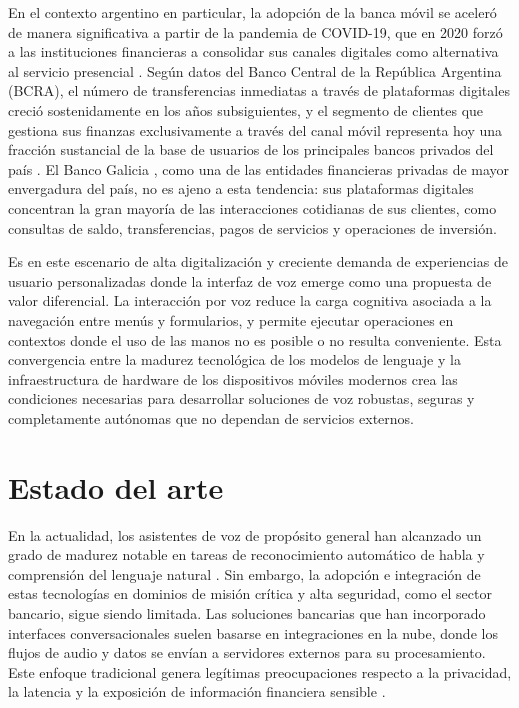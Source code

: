 En el contexto argentino en particular, la adopción de la banca móvil se aceleró de manera significativa a partir de la pandemia de COVID-19, que en 2020 forzó a las instituciones financieras a consolidar sus canales digitales como alternativa al servicio presencial \citep{rengifo2022}. Según datos del Banco Central de la República Argentina (BCRA), el número de transferencias inmediatas a través de plataformas digitales creció sostenidamente en los años subsiguientes, y el segmento de clientes que gestiona sus finanzas exclusivamente a través del canal móvil representa hoy una fracción sustancial de la base de usuarios de los principales bancos privados del país \citep{WEBSITE:1}. El Banco Galicia \citep{clarin2024galicia}, como una de las entidades financieras privadas de mayor envergadura del país, no es ajeno a esta tendencia: sus plataformas digitales concentran la gran mayoría de las interacciones cotidianas de sus clientes, como consultas de saldo, transferencias, pagos de servicios y operaciones de inversión.

Es en este escenario de alta digitalización y creciente demanda de experiencias de usuario personalizadas donde la interfaz de voz emerge como una propuesta de valor diferencial. La interacción por voz reduce la carga cognitiva asociada a la navegación entre menús y formularios, y permite ejecutar operaciones en contextos donde el uso de las manos no es posible o no resulta conveniente. Esta convergencia entre la madurez tecnológica de los modelos de lenguaje y la infraestructura de hardware de los dispositivos móviles modernos crea las condiciones necesarias para desarrollar soluciones de voz robustas, seguras y completamente autónomas que no dependan de servicios externos.



\section{Estado del arte}

En la actualidad, los asistentes de voz de propósito general han alcanzado un grado de madurez notable en tareas de reconocimiento automático de habla y comprensión del lenguaje natural \citep{frontline2025voice, deepgram2026voice}. Sin embargo, la adopción e integración de estas tecnologías en dominios de misión crítica y alta seguridad, como el sector bancario, sigue siendo limitada. Las soluciones bancarias que han incorporado interfaces conversacionales suelen basarse en integraciones en la nube, donde los flujos de audio y datos se envían a servidores externos para su procesamiento. Este enfoque tradicional genera legítimas preocupaciones respecto a la privacidad, la latencia y la exposición de información financiera sensible \citep{kardome2025voiceprivacy}.

